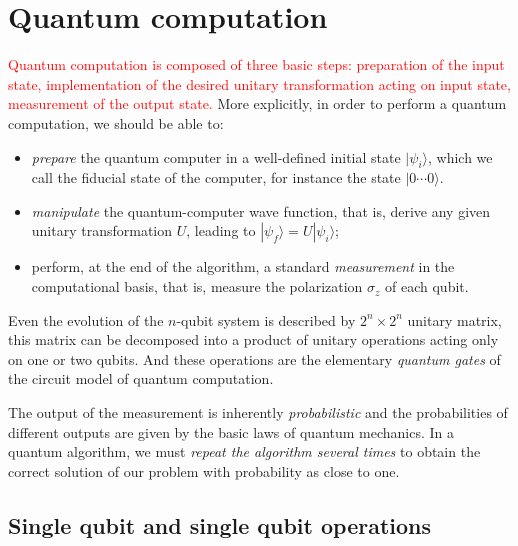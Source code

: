 \documentclass{article}
\newcommand{\ket}[1]{| #1 \rangle}  %
\begin{document}
\section{Quantum computation}
\textcolor{red}{Quantum computation is composed of three basic steps: preparation of the input state, implementation of the desired unitary transformation acting on input state, measurement of the output state.}
More explicitly, in order to perform a quantum computation, we should be able to:
\begin{itemize}
	\item \textit{prepare} the quantum computer in a well-defined initial state $\ket{\psi_i}$, which we call the fiducial state of the computer, for instance the state $\ket{0\cdots 0}$.
	\item \textit{manipulate} the quantum-computer wave function, that is, derive any given unitary transformation $U$, leading to $\ket{\psi_f}=U\ket{\psi_i}$;
	\item perform, at the end of the algorithm, a standard \textit{measurement} in the computational basis, that is, measure the polarization $\sigma_z$ of each qubit.
\end{itemize}
Even the evolution of the $n$-qubit system is described by $2^n\times 2^n$ unitary matrix, this matrix can be decomposed into a product of unitary operations acting only on one or two qubits. And these operations are the elementary \textit{quantum gates} of the circuit model of quantum computation.


The output of the measurement is inherently \textit{probabilistic} and the probabilities of different outputs are given by the basic laws of quantum mechanics. In a quantum algorithm, we must \textit{repeat the algorithm several times} to obtain the correct solution of our problem with probability as close to one.





\subsection{Single qubit and single qubit operations}
\end{document}
